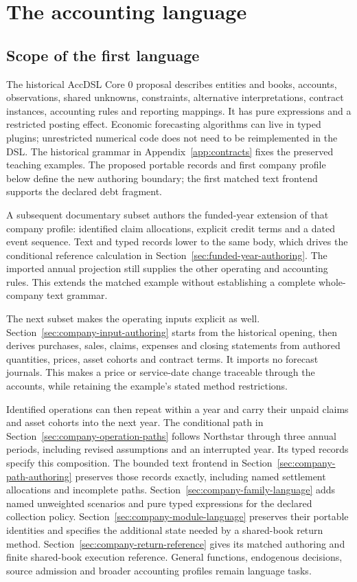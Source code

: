 \chapter{The accounting language}
\label{ch:language}

\section{Scope of the first language}

The historical AccDSL Core 0 proposal describes entities and books, accounts, observations, shared
unknowns, constraints, alternative interpretations, contract instances,
accounting rules and reporting mappings. It has pure expressions and a
restricted posting effect. Economic forecasting algorithms can live in typed
plugins; unrestricted numerical code does not need to be reimplemented in
the DSL. The historical grammar in Appendix~\ref{app:contracts} fixes the preserved
teaching examples. The proposed portable records and first company profile
below define the new authoring boundary; the first matched text frontend
supports the declared debt fragment.

A subsequent documentary subset authors the funded-year extension of that
company profile: identified claim allocations, explicit credit terms and a
dated event sequence. Text and typed records lower to the same body, which
drives the conditional reference calculation in
Section~\ref{sec:funded-year-authoring}. The imported annual projection still
supplies the other operating and accounting rules. This extends the matched
example without establishing a complete whole-company text grammar.

The next subset makes the operating inputs explicit as well.
Section~\ref{sec:company-input-authoring} starts from the historical opening,
then derives purchases, sales, claims, expenses and closing statements from
authored quantities, prices, asset cohorts and contract terms. It imports no
forecast journals. This makes a price or service-date change traceable through
the accounts, while retaining the example's stated method restrictions.

Identified operations can then repeat within a year and carry their unpaid
claims and asset cohorts into the next year. The conditional path in
Section~\ref{sec:company-operation-paths} follows Northstar through three
annual periods, including revised assumptions and an interrupted year.
Its typed records specify this composition. The bounded text frontend in
Section~\ref{sec:company-path-authoring} preserves those records exactly,
including named settlement allocations and incomplete paths.
Section~\ref{sec:company-family-language} adds named unweighted scenarios and
pure typed expressions for the declared collection policy.
Section~\ref{sec:company-module-language} preserves their portable identities
and specifies the additional state needed by a shared-book return method.
Section~\ref{sec:company-return-reference} gives its matched authoring
and finite shared-book execution reference. General functions,
endogenous decisions, source admission and broader accounting profiles remain
language tasks.

